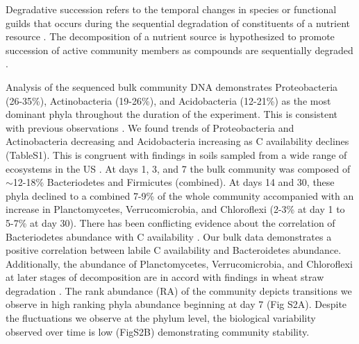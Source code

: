  
 Degradative succession refers to the temporal changes in species or functional guilds that occurs during the sequential degradation of constituents of a nutrient resource \cite{townsend2003essentials,Bastian_2009}. The decomposition of a nutrient source is hypothesized to promote succession of active community members as compounds are sequentially degraded \cite{Biddanda_1988}. 


Analysis of the sequenced bulk community DNA demonstrates Proteobacteria (26-35\%), Actinobacteria (19-26\%), and Acidobacteria (12-21\%) as the most dominant phyla throughout the duration of the experiment. This is consistent with previous observations \cite{Goldfarb_2011,Fierer_2007,Rui_2009,Fierer_2012}. We found trends of Proteobacteria and Actinobacteria decreasing and Acidobacteria increasing as C availability declines (TableS1). This is congruent with findings in soils sampled from a wide range of ecosystems in the US \cite{Fierer_2007}. At days 1, 3, and 7 the bulk community was composed of $\sim$12-18\% Bacteriodetes and Firmicutes (combined).  At days 14 and 30, these phyla declined to a combined 7-9\% of the whole community accompanied with an increase in Planctomycetes, Verrucomicrobia, and Chloroflexi (2-3\% at day 1 to 5-7\% at day 30). There has been conflicting evidence about the correlation of Bacteriodetes abundance with C availability \cite{Fierer_2007,Rui_2009,Sharp_2000,L_pez_Lozano_2013,Bastian_2009}. Our bulk data demonstrates a positive correlation between labile C availability and Bacteroidetes abundance. Additionally, the abundance of Planctomycetes, Verrucomicrobia, and Chloroflexi at later stages of decomposition are in accord with findings in wheat straw degradation \cite{Bastian_2009}. The rank abundance (RA) of the community depicts transitions we observe in high ranking phyla abundance beginning at day 7 (Fig S2A). Despite the fluctuations we observe at the phylum level, the biological variability observed over time is low (FigS2B) demonstrating community stability.

